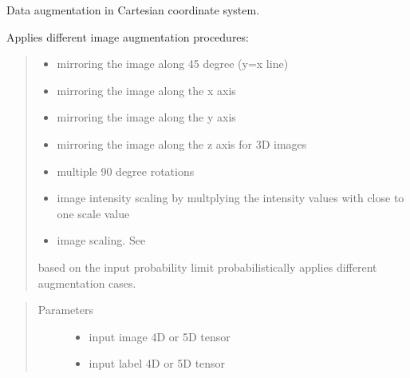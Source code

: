 \documentclass[letterpaper,10pt,english]{sphinxmanual}
\begin{document}

\begin{fulllineitems}
\label{\detokenize{index:util.load_batch.img_aug_carts}}
Data augmentation in Cartesian coordinate system.

Applies different image augmentation procedures:
\begin{quote}
\begin{itemize}
\item {} 
mirroring the image along 45 degree (y=x line)

\item {} 
mirroring the image along the x axis

\item {} 
mirroring the image along the y axis

\item {} 
mirroring the image along the z axis for 3D images

\item {} 
multiple 90 degree rotations

\item {} 
image intensity scaling by multplying the intensity values with close to one scale value

\item {} 
image scaling.  See {\hyperref[\detokenize{index:util.load_batch.img_rand_scale}]{}}

\end{itemize}

based on the input probability limit probabilistically applies different augmentation cases.
\end{quote}
\begin{quote}\begin{description}
\item[{Parameters}] \leavevmode\begin{itemize}
\item {} 
 \textendash{} input image 4D or 5D tensor

\item {} 
 \textendash{} input label 4D or 5D tensor


\end{itemize}
\end{description}
\end{quote}
\end{fulllineitems}
\end{document}
